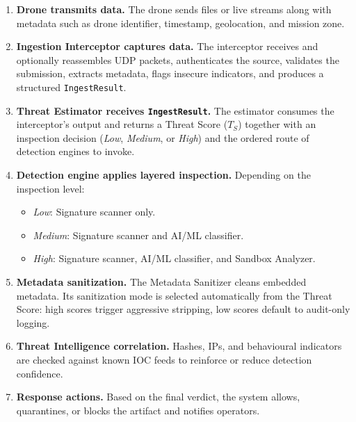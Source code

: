 \documentclass[12pt, a4paper]{report}
\begin{document}
\begin{enumerate}
    \item \textbf{Drone transmits data.} The drone sends files or live
          streams along with metadata such as drone identifier, timestamp,
          geolocation, and mission zone.

    \item \textbf{Ingestion Interceptor captures data.} The interceptor
          receives and optionally reassembles UDP packets, authenticates
          the source, validates the submission, extracts metadata, flags
          insecure indicators, and produces a structured
          \texttt{IngestResult}.

    \item \textbf{Threat Estimator receives \texttt{IngestResult}.}
          The estimator consumes the interceptor's output and returns a
          Threat Score ($T_S$) together with an inspection decision
          (\emph{Low}, \emph{Medium}, or \emph{High}) and the ordered
          route of detection engines to invoke.

    \item \textbf{Detection engine applies layered inspection.} Depending
          on the inspection level:
          \begin{itemize}
              \item \emph{Low}: Signature scanner only.
              \item \emph{Medium}: Signature scanner and AI/ML classifier.
              \item \emph{High}: Signature scanner, AI/ML classifier, and
                    Sandbox Analyzer.
          \end{itemize}

    \item \textbf{Metadata sanitization.} The Metadata Sanitizer cleans
          embedded metadata. Its sanitization mode is selected
          automatically from the Threat Score: high scores trigger
          aggressive stripping, low scores default to audit-only logging.

    \item \textbf{Threat Intelligence correlation.} Hashes, IPs, and
          behavioural indicators are checked against known IOC feeds to
          reinforce or reduce detection confidence.

    \item \textbf{Response actions.} Based on the final verdict, the
          system allows, quarantines, or blocks the artifact and notifies
          operators.


\end{enumerate}
\end{document}

